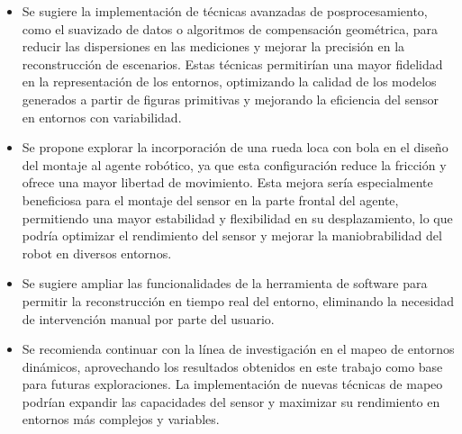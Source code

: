 \begin{itemize}
	\item Se sugiere la implementación de técnicas avanzadas de posprocesamiento, como el suavizado de datos o algoritmos de compensación geométrica, para reducir las dispersiones en las mediciones y mejorar la precisión en la reconstrucción de escenarios. Estas técnicas permitirían una mayor fidelidad en la representación de los entornos, optimizando la calidad de los modelos generados a partir de figuras primitivas y mejorando la eficiencia del sensor en entornos con variabilidad.
	\item Se propone explorar la incorporación de una rueda loca con bola en el diseño del montaje al agente robótico, ya que esta configuración reduce la fricción y ofrece una mayor libertad de movimiento. Esta mejora sería especialmente beneficiosa para el montaje del sensor en la parte frontal del agente, permitiendo una mayor estabilidad y flexibilidad en su desplazamiento, lo que podría optimizar el rendimiento del sensor y mejorar la maniobrabilidad del robot en diversos entornos.
	\item Se sugiere ampliar las funcionalidades de la herramienta de software para permitir la reconstrucción en tiempo real del entorno, eliminando la necesidad de intervención manual por parte del usuario.
	\item  Se recomienda continuar con la línea de investigación en el mapeo de entornos dinámicos, aprovechando los resultados obtenidos en este trabajo como base para futuras exploraciones. La implementación de nuevas técnicas de mapeo podrían expandir las capacidades del sensor y maximizar su rendimiento en entornos más complejos y variables.
\end{itemize}


